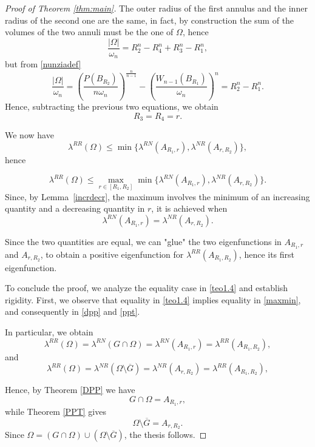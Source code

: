 \documentclass[oneside,a4paper,11pt,notitlepage]{article}
\theoremstyle{plain}
\numberwithin{teor}{section}
\numberwithin{equation}{section}
\theoremstyle{definition}
\theoremstyle{plain}
\theoremstyle{plain}
\theoremstyle{plain}
\theoremstyle{plain}
\theoremstyle{definition}
\theoremstyle{definition}
\theoremstyle{plain}
\begin{document}
\begin{proof}[Proof of Theorem \ref{thm:main}]
The outer radius of the first annulus and the inner radius of the second one are the same, in fact, by construction the sum of the volumes of the two annuli must be the one of $\Omega$, hence
$$
\displaystyle \frac{|\Omega|}{\omega_n}=R_2^n - R_4^n +R_3^n-R_1^n,
$$
but from \eqref{nunziadef}
$$ \displaystyle \frac{|\Omega|}{\omega_n}= \displaystyle \left(\frac{P(B_{R_2})}{n\omega_ n}\right)^\frac{n}{n-1}-\displaystyle \left(\frac{W_{n-1}(B_{R_{1}})}{\omega_ n}\right)^n= R_2^n -R_1^n.$$
Hence, subtracting the previous two equations, we obtain
$$
R_3=R_4=r.
$$

We now have 
$$
\lambda^{{RR}}(\Omega) \leq \min \{\lambda^{RN}(A_{R_1,r}), \lambda^{NR}(A_{r,R_2})\},
$$
hence

\begin{equation}
    \label{maxmin}
    \lambda^{{RR}}(\Omega) \leq\max_{r \in [R_1,R_2]} \min \{\lambda^{RN}(A_{R_1,r}), \lambda^{NR}(A_{r,R_2})\}.
\end{equation}
Since, by Lemma~\ref{incrdecr}, the maximum involves the minimum of an increasing quantity and a decreasing quantity in $r$, it is achieved when
\[
\lambda^{RN}(A_{R_1,r}) = \lambda^{NR}(A_{r,R_2}).
\]


Since the two quantities are equal, we can "glue" the two eigenfunctions in $A_{R_1,r}$ and $A_{r, R_2}$, to obtain a positive eigenfunction for $\lambda^{RR}(A_{R_1,R_2})$, hence its first eigenfunction.

To conclude the proof, we analyze the equality case in \eqref{teo1.4} and establish rigidity. First, we observe that equality in \eqref{teo1.4} implies equality in \eqref{maxmin}, and consequently in \eqref{dpp} and \eqref{ppt}.

In particular, we obtain
\begin{equation}
\label{==dpp}
\lambda^{RR}(\Omega)=\lambda^{RN}(G\cap \Omega)=\lambda^{RN}(A_{R_1,r})=\lambda^{RR}(A_{R_1,R_2}),
\end{equation}
and
\begin{equation}
\label{==ppt}
\lambda^{RR}(\Omega)=\lambda^{NR}(\Omega\setminus \overline{G})=\lambda^{NR}(A_{r,R_2})=\lambda^{RR}(A_{R_1,R_2}),
\end{equation}

Hence, by Theorem \ref{DPP} we have 
$$G \cap \Omega = A_{R_1,r},$$
while 
Theorem \ref{PPT} gives
$$ \Omega \setminus\overline G = A_{r,R_2}.$$
Since $\Omega = (G \cap \Omega) \cup (\Omega \setminus\overline G)$, the thesis follows.

\end{proof}
\end{document}
